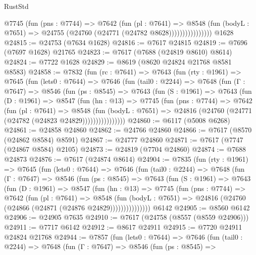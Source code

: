 \begin{lexlean}{RustStd}
\begin{coremodule}
                      @7745
                        (fun (pns : @7744) =>
                        @7642
                          (fun (pl : @7641) =>
                          @8548
                            (fun (bodyL : @7651) =>
                            @24755 (@24760 (@24771 (@24782 @8628))))))))))))))))
    @1628
@24815 := @24753 (@7634 @1628)
@24816 := @7617 @24815
@24819 := @7696 (@7697 @1628) @21765
@24823 := @7617 (@7688 (@24819 @8610) @8614)
@24824 := @7722 @1628
@24829 := @8619 (@8620 @24824 @21768 @8581 @8583)
@24858 := @7832
    (fun (rc : @7641) =>
    @7643
      (fun (rty : @1961) =>
      @7645
        (fun (lets0 : @7644) =>
        @7646
          (fun (tail0 : @2244) =>
          @7648
            (fun (Γ : @7647) =>
            @8546
              (fun (ps : @8545) =>
              @7643
                (fun (S : @1961) =>
                @7643
                  (fun (D : @1961) =>
                  @8547
                    (fun (hn : @13) =>
                    @7745
                      (fun (pns : @7744) =>
                      @7642
                        (fun (pl : @7641) =>
                        @8548
                          (fun (bodyL : @7651) =>
                          @24816 (@24760 (@24771 (@24782 (@24823 @24829))))))))))))))))
@24860 := @6117 (@5008 @6268)
@24861 := @24858 @24860
@24862 := @24766 @24860
@24866 := @7617 (@8570 (@24862 @8584) @8591)
@24867 := @24777 @24860
@24871 := @7617 (@7747 (@24867 @8584) @2105)
@24873 := @24819 (@7704 @24860)
@24874 := @7688 @24873
@24876 := @7617 (@24874 @8614)
@24904 := @7835
    (fun (rty : @1961) =>
    @7645
      (fun (lets0 : @7644) =>
      @7646
        (fun (tail0 : @2244) =>
        @7648
          (fun (Γ : @7647) =>
          @8546
            (fun (ps : @8545) =>
            @7643
              (fun (S : @1961) =>
              @7643
                (fun (D : @1961) =>
                @8547
                  (fun (hn : @13) =>
                  @7745
                    (fun (pns : @7744) =>
                    @7642
                      (fun (pl : @7641) =>
                      @8548
                        (fun (bodyL : @7651) =>
                        @24816 (@24760 (@24866 (@24871 (@24876 @24829)))))))))))))))
    @6142
@24905 := @8560 @6142
@24906 := @24905 @7635
@24910 := @7617 (@24758 (@8557 (@8559 @24906)))
@24911 := @7717 @6142
@24912 := @8617 @24911
@24915 := @7720 @24911 @24824 @21768
@24944 := @7857
    (fun (lets0 : @7644) =>
    @7646
      (fun (tail0 : @2244) =>
      @7648
        (fun (Γ : @7647) =>
        @8546
          (fun (ps : @8545) =>

\end{coremodule}
\end{lexlean}
